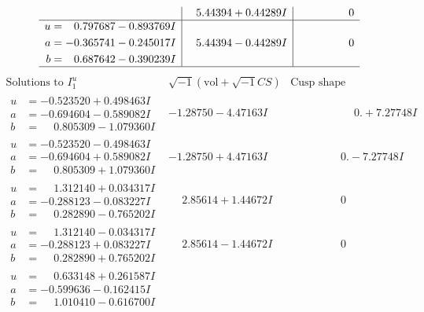 \documentclass[1p]{elsarticle_modified}
\theoremstyle{definition}
\newcommand{\I}{\sqrt{-1}}
\begin{document}
$$\begin{array}{c|c|c}
 & \phantom{-}5.44394 + 0.44289 I & \phantom{-0.000000 } 0 \\ \hline\begin{aligned}
u &= \phantom{-}0.797687 - 0.893769 I \\
a &= -0.365741 - 0.245017 I \\
b &= \phantom{-}0.687642 - 0.390239 I\end{aligned}
 & \phantom{-}5.44394 - 0.44289 I & \phantom{-0.000000 } 0\\
 \hline 
 \end{array}$$\newpage$$\begin{array}{c|c|c}  
\text{Solutions to }I^u_{1}& \I (\text{vol} + \sqrt{-1}CS) & \text{Cusp shape}\\
 \hline 
\begin{aligned}
u &= -0.523520 + 0.498463 I \\
a &= -0.694604 - 0.589082 I \\
b &= \phantom{-}0.805309 - 1.079360 I\end{aligned}
 & -1.28750 - 4.47163 I & \phantom{-0.000000 -}0. + 7.27748 I \\ \hline\begin{aligned}
u &= -0.523520 - 0.498463 I \\
a &= -0.694604 + 0.589082 I \\
b &= \phantom{-}0.805309 + 1.079360 I\end{aligned}
 & -1.28750 + 4.47163 I & \phantom{-0.000000 } 0. - 7.27748 I \\ \hline\begin{aligned}
u &= \phantom{-}1.312140 + 0.034317 I \\
a &= -0.288123 - 0.083227 I \\
b &= \phantom{-}0.282890 - 0.765202 I\end{aligned}
 & \phantom{-}2.85614 + 1.44672 I & \phantom{-0.000000 } 0 \\ \hline\begin{aligned}
u &= \phantom{-}1.312140 - 0.034317 I \\
a &= -0.288123 + 0.083227 I \\
b &= \phantom{-}0.282890 + 0.765202 I\end{aligned}
 & \phantom{-}2.85614 - 1.44672 I & \phantom{-0.000000 } 0 \\ \hline\begin{aligned}
u &= \phantom{-}0.633148 + 0.261587 I \\
a &= -0.599636 - 0.162415 I \\
b &= \phantom{-}1.010410 - 0.616700 I\end{aligned}

\end{array}$$
\end{document}
